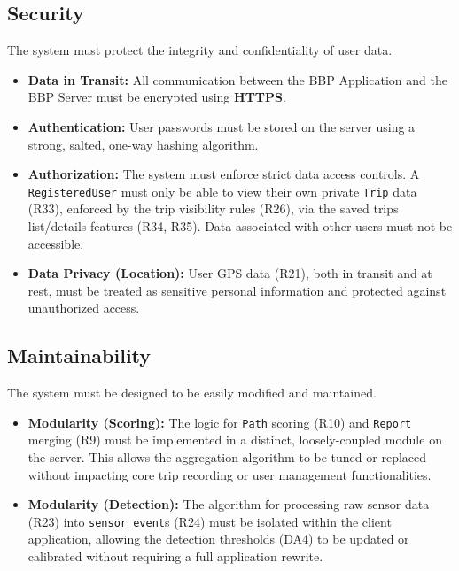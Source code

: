 \subsection{Security}
\label{subsec:security}%
The system must protect the integrity and confidentiality of user data.
\begin{itemize}[leftmargin=*, itemsep=2pt]
    \item \textbf{Data in Transit:} All communication between the BBP Application and the BBP Server must be encrypted using \textbf{HTTPS}.
    \item \textbf{Authentication:} User passwords must be stored on the server using a strong, salted, one-way hashing algorithm.
    \item \textbf{Authorization:} The system must enforce strict data access controls. A \texttt{RegisteredUser} must only be able to view their own private \texttt{Trip} data (R33), enforced by the trip visibility rules (R26), via the saved trips list/details features (R34, R35). Data associated with other users must not be accessible.
    \item \textbf{Data Privacy (Location):} User GPS data (R21), both in transit and at rest, must be treated as sensitive personal information and protected against unauthorized access.
\end{itemize}

\subsection{Maintainability}
\label{subsec:maintainability}%
The system must be designed to be easily modified and maintained.
\begin{itemize}[leftmargin=*, itemsep=2pt]
    \item \textbf{Modularity (Scoring):} The logic for \texttt{Path} scoring (R10) and \texttt{Report} merging (R9) must be implemented in a distinct, loosely-coupled module on the server. This allows the aggregation algorithm to be tuned or replaced without impacting core trip recording or user management functionalities.
    \item \textbf{Modularity (Detection):} The algorithm for processing raw sensor data (R23) into \texttt{sensor\_event}s (R24) must be isolated within the client application, allowing the detection thresholds (DA4) to be updated or calibrated without requiring a full application rewrite.
\end{itemize}

